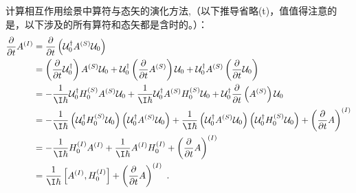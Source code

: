 计算相互作用绘景中算符与态矢的演化方法,（以下推导省略(t)，值值得注意的是，以下涉及的所有算符和态矢都是含时的。）：
\begin{align}
\frac{\partial}{\partial t}A^{(I)}&=\frac{\partial}{\partial t}\left(\mathcal U_0^\dagger A^{(S)}\mathcal U_0 \right)\\
&=\left(\frac{\partial}{\partial t}\mathcal U_0^\dagger\right) A^{(S)}\mathcal U_0 +\mathcal U_0^\dagger \left(\frac{\partial}{\partial t}A^{(S)}\right)\mathcal U_0+\mathcal U_0^\dagger A^{(S)}\left(\frac{\partial}{\partial t}\mathcal U_0\right)\\
&=-\frac{1}{\I\hbar}\mathcal U_0^\dagger H^{(S)}_0A^{(S)}\mathcal U_0 +\frac{1}{\I\hbar}\mathcal U_0^\dagger A^{(S)}H^{(S)}_0\mathcal U_0+\mathcal U_0^\dagger \frac{\partial}{\partial t}\left(A^{(S)}\right)\mathcal U_0 \\
&=-\frac{1}{\I\hbar}\left(\mathcal U_0^\dagger H^{(S)}_0 \mathcal U_0\right)\left(\mathcal U_0^\dagger A^{(S)}\mathcal U_0\right) +\frac{1}{\I\hbar}\left(\mathcal U_0^\dagger A^{(S)}\mathcal U_0\right)\left(\mathcal U_0^\dagger H^{(S)}_0\mathcal U_0\right)+\left(\frac{\partial}{\partial t}A\right)^{(I)} \\
&=-\frac{1}{\I\hbar} H^{(I)}_0  A^{(I)}+\frac{1}{\I\hbar} A^{(I)} H^{(I)}_0+\left(\frac{\partial}{\partial t}A\right)^{(I)} \\
&=\frac{1}{\I\hbar}\left[A^{(I)},H_0^{(I)}\right]+\left(\frac{\partial}{\partial t}A\right)^{(I)}~.
\end{align}



